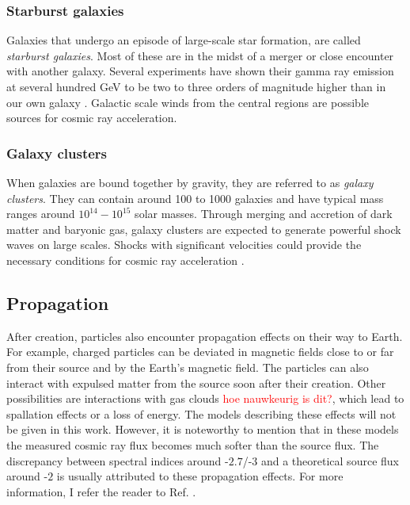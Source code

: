 
\subsubsection{Starburst galaxies}
Galaxies that undergo an episode of large-scale star formation, are called \textit{starburst galaxies}. Most of these are in the midst of a merger or close encounter with another galaxy. Several experiments have shown their gamma ray emission at several hundred GeV to be two to three orders of magnitude higher than in our own galaxy \cite{Acero:2009nb,Karlsson:2009hd}. Galactic scale winds from the central regions are possible sources for cosmic ray acceleration.

\subsubsection{Galaxy clusters}
When galaxies are bound together by gravity, they are referred to as \textit{galaxy clusters}. They can contain around 100 to 1000 galaxies and have typical mass ranges around $10^{14}-10^{15}$ solar masses. Through merging and accretion of dark matter and baryonic gas, galaxy clusters are expected to generate powerful shock waves on large scales. Shocks with significant velocities could provide the necessary conditions for cosmic ray acceleration \cite{1538-4357-689-2-L105}.

\subsection{Propagation}
\label{subsec:propagation}
After creation, particles also encounter propagation effects on their way to Earth. For example, charged particles can be deviated in magnetic fields close to or far from their source and by the Earth's magnetic field. The particles can also interact with expulsed matter from the source soon after their creation. Other possibilities are interactions with gas clouds \textcolor{red}{hoe nauwkeurig is dit?}, which lead to spallation effects or a loss of energy. The models describing these effects will not be given in this work. However, it is noteworthy to mention that in these models the measured cosmic ray flux becomes much softer than the source flux. The discrepancy between spectral indices around -$2.7$/-$3$ and a theoretical source flux around -$2$ is usually attributed to these propagation effects. For more information, I refer the reader to Ref. \cite{Gaisser:2016uoy}.


